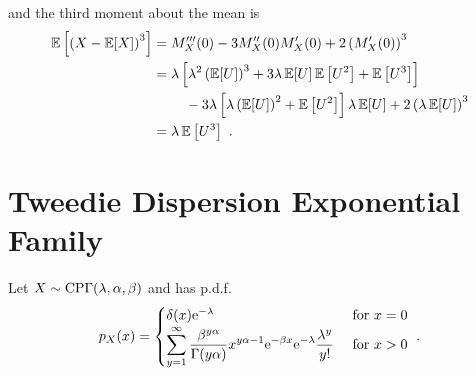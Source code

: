 and the third moment about the mean is
\begin{align}
  \expectation\left[\left(X-\expectation[X]\right)^3\right] & =
  M_X'''(0) - 3M_X''(0)M_X'(0) + 2\left(M_X'(0)\right)^3
  \nonumber\\
  &=
  \begin{multlined}[t]
    \lambda \left[
      \lambda^2 \left(\expectation[U]\right)^3 + 3\lambda \expectation[U]\expectation\left[U^2\right] + \expectation\left[U^3\right]
    \right]
    \\-3\lambda\left[\lambda\left(\expectation[U]\right)^2+\expectation\left[U^2\right]\right]\lambda\expectation[U] + 2\left(\lambda\expectation[U]\right)^3
  \end{multlined}
  \nonumber\\
  &=\lambda\expectation\left[U^3\right] \ .
\end{align}

\section{Tweedie Dispersion Exponential Family}
\label{chapter:appendix_tweedie}
Let $X\sim\operatorname{CP\Gamma}(\lambda,\alpha,\beta)$ and has p.d.f.
\begin{equation}
  p_X(x) = 
  \begin{cases}
    \delta(x) \mathrm{e}^{-\lambda} & \text{ for } x=0 \\ 
    \displaystyle\sum_{y=1}^{\infty}\dfrac{\beta^{y\alpha}}{\Gamma(y\alpha)}x^{y\alpha-1}\mathrm{e}^{-\beta x}\mathrm{e}^{-\lambda}\frac{\lambda^y}{y!} & \text{ for } x>0
  \end{cases}
  \ .
  \label{eq:appendix_compoundPoisson_pdf}
\end{equation}

